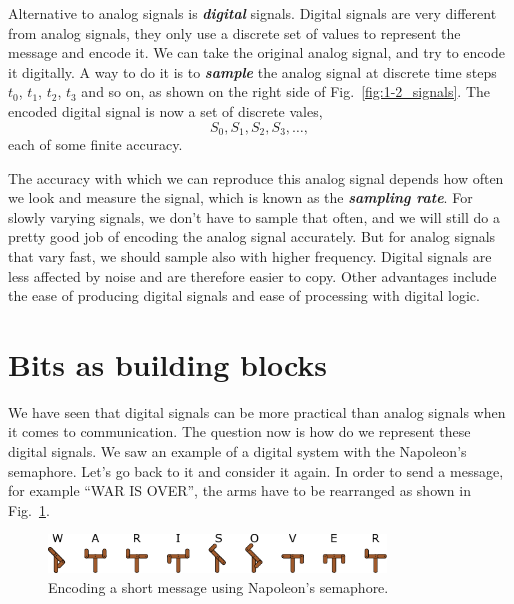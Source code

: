 Alternative to analog signals is \textit{\textbf{digital}} signals.
Digital signals are very different from analog signals, they only use a discrete set of values to represent the message and encode it.
We can take the original analog signal, and try to encode it digitally.
A way to do it is to \textit{\textbf{sample}} the analog signal at discrete time steps $t_0$, $t_1$, $t_2$, $t_3$ and so on, as shown on the right side of Fig.~\ref{fig:1-2_signals}.
The encoded digital signal is now a set of discrete vales,
\begin{equation}
    S_0, S_1, S_2, S_3, \ldots,
\end{equation}
each of some finite accuracy.

The accuracy with which we can reproduce this analog signal depends how often we look and measure the signal, which is known as the \textit{\textbf{sampling rate}}.
For slowly varying signals, we don't have to sample that often, and we will still do a pretty good job of encoding the analog signal accurately.
But for analog signals that vary fast, we should sample also with higher frequency.
Digital signals are less affected by noise and are therefore easier to copy.
Other advantages include the ease of producing digital signals and ease of processing with digital logic.


\section{Bits as building blocks}


We have seen that digital signals can be more practical than analog signals when it comes to communication.
The question now is how do we represent these digital signals.
We saw an example of a digital system with the Napoleon's semaphore.
Let's go back to it and consider it again.
In order to send a message, for example ``WAR IS OVER'', the arms have to be rearranged as shown in Fig.~\ref{fig:1-3_warisover}.

\begin{figure}[t]
    \centering
    \includegraphics[width=0.8\textwidth]{lesson1/1-3_warisover.pdf}
    \caption[Message with Napoleon's semaphore]{Encoding a short message using Napoleon's semaphore.}
    \label{fig:1-3_warisover}
\end{figure}

